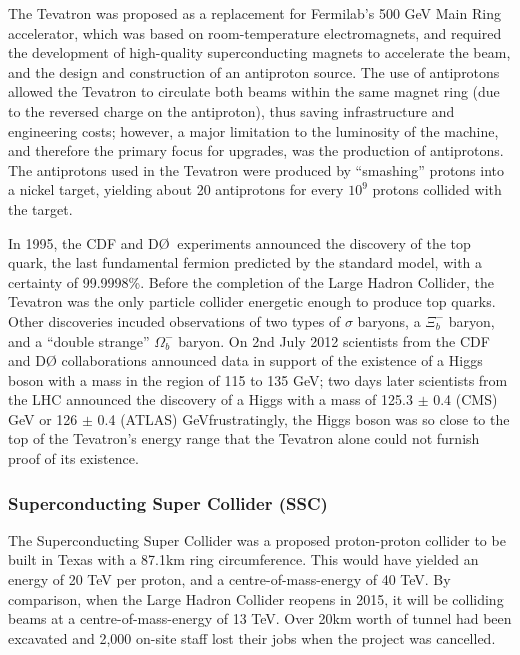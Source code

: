 The Tevatron was proposed as a replacement for Fermilab's 500 GeV Main Ring accelerator, which was based on room-temperature electromagnets, and required the development of high-quality superconducting magnets to accelerate the beam, and the design and construction of an antiproton source\cite{Tevatron:Retrospective:Online}. The use of antiprotons allowed the Tevatron to circulate both beams within the same magnet ring (due to the reversed charge on the antiproton), thus saving infrastructure and engineering costs; however, a major limitation to the luminosity of the machine, and therefore the primary focus for upgrades, was the production of antiprotons. The antiprotons used in the Tevatron were produced by ``smashing'' protons into a nickel target, yielding about 20 antiprotons for every $10^{9}$ protons collided with the target\cite{Tevatron:Antiprotons:Online}.

In 1995, the CDF and D\O$\:$ experiments announced the discovery of the top quark, the last fundamental fermion predicted by the standard model, with a certainty of 99.9998\%\cite{PhysRevLett:Top1,PhysRevLett:Top2}. Before the completion of the Large Hadron Collider, the Tevatron was the only particle collider energetic enough to produce top quarks. Other discoveries incuded observations of two types of $\sigma$ baryons\cite{Fermi:Sigma:Online}, a $\Xi_{b}^{-}$ baryon\cite{Fermi:Xi:Online}, and a ``double strange'' $\Omega_{b}^{-}$ baryon\cite{PhysRevLett:Omega}. On 2nd July 2012 scientists from the CDF and D\O\: collaborations announced data in support of the existence of a Higgs boson with a mass in the region of 115 to 135 GeV\cite{Fermi:Higgs:Online}; two days later scientists from the LHC announced the discovery of a Higgs with a mass of 125.3 $\pm$ 0.4 (CMS) GeV\cite{PhysLettB:Higgs:CMS} or 126 $\pm$ 0.4 (ATLAS) GeV\cite{PhysLettB:Higgs:ATLAS}\textemdash frustratingly, the Higgs boson was so close to the top of the Tevatron's energy range that the Tevatron alone could not furnish proof of its existence.

\subsubsection{Superconducting Super Collider (SSC)}
The Superconducting Super Collider was a proposed proton-proton\cite{SSC:LAT:Online} collider to be built in Texas with a 87.1km ring circumference. This would have yielded an energy of 20 TeV per proton, and a centre-of-mass-energy of 40 TeV. By comparison, when the Large Hadron Collider reopens in 2015, it will be colliding beams at a centre-of-mass-energy of 13 TeV\cite{LHC:14TeV:Online}. Over 20km worth of tunnel had been excavated and 2,000 on-site staff lost their jobs when the project was cancelled\cite{SSC:Sun:Online}.

